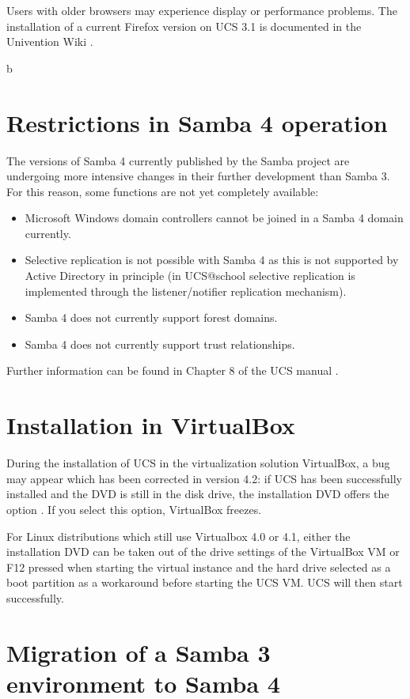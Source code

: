 Users with older browsers may experience display or performance
problems. The installation of a current Firefox version on UCS 3.1 is
documented in the Univention Wiki \cite{ucd-firefox7}.

b\section{Restrictions in Samba 4 operation}

The versions of Samba 4 currently published by the Samba project are
undergoing more intensive changes in their further
development than Samba 3. For this reason, some functions are not yet
completely available:

\begin{itemize}
\item Microsoft Windows domain controllers cannot be joined in a Samba
4 domain currently.
\item Selective replication is not possible with Samba 4 as this is
not supported by Active Directory in principle (in UCS@school
selective replication is implemented through the listener/notifier
replication mechanism).

\item Samba 4 does not currently support forest domains. 
\item Samba 4 does not currently support trust relationships.
\end{itemize}

Further information can be found in Chapter 8 of the UCS
manual \cite{UCS-Handbuch}.

\section{Installation in VirtualBox}
During the installation of UCS in the virtualization solution VirtualBox, a bug
may appear which has been corrected in version 4.2: if UCS has been
successfully installed and the DVD is still in the disk drive, the
installation DVD offers the option . If you select this option, VirtualBox freezes. 

For Linux distributions which still use Virtualbox 4.0 or 4.1, either
the installation DVD can be taken out of the drive settings of the
VirtualBox VM or F12 pressed when starting the virtual instance and
the hard drive selected as a boot partition as a workaround before
starting the UCS VM. UCS will then start successfully.

\section{Migration of a Samba 3 environment to Samba 4}
\label{samba-migration}

